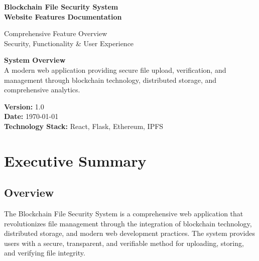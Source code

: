 \documentclass[11pt,a4paper]{article}
\begin{document}
\begin{titlepage}
\centering
\vspace*{2cm}

{\Huge\bfseries\color{primaryblue}
Blockchain File Security System\\
\vspace{0.5cm}
\Large Website Features Documentation}

\vspace{2cm}

{\large\color{gray}
Comprehensive Feature Overview\\
Security, Functionality \& User Experience}

\vspace{3cm}

\begin{tcolorbox}[colback=backgroundgray, colframe=primaryblue, width=0.8\textwidth]
\centering
\textbf{System Overview}\\
\vspace{0.5cm}
A modern web application providing secure file upload, verification, and management through blockchain technology, distributed storage, and comprehensive analytics.
\end{tcolorbox}

\vfill

{\large
\textbf{Version:} 1.0\\
\textbf{Date:} \today\\
\textbf{Technology Stack:} React, Flask, Ethereum, IPFS}

\end{titlepage}

\tableofcontents
\newpage

\section{Executive Summary}

\subsection{Overview}
The Blockchain File Security System is a comprehensive web application that revolutionizes file management through the integration of blockchain technology, distributed storage, and modern web development practices. The system provides users with a secure, transparent, and verifiable method for uploading, storing, and verifying file integrity.
\end{document}
